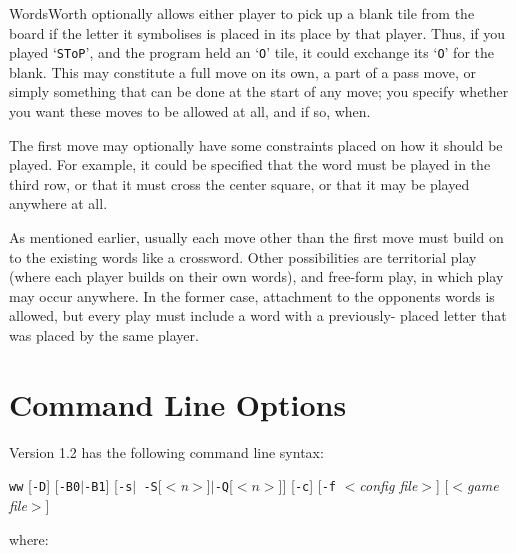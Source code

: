 WordsWorth optionally allows either player to pick up a blank 
tile from the board if the letter it symbolises is placed in its
place by that player. Thus, if you played `{\tt SToP}', and the program
held an `{\tt O}' tile, it could exchange its `{\tt O}' for the blank. This
may constitute a full move on its own, a part of a pass move, or
simply something that can be done at the start of any move; you
specify whether you want these moves to be allowed at all, and 
if so, when.

The first move may optionally have some constraints placed on how
it should be played. For example, it could be specified that the
word must be played in the third row, or that it must cross the
center square, or that it may be played anywhere at all.

As mentioned earlier, usually each move other than the first move
must build on to the existing words like a crossword. Other
possibilities are territorial play (where each player builds on
their own words), and free-form play, in which play may occur
anywhere. In the former case, attachment to the opponents words
is allowed, but every play must include a word with a previously-
placed letter that was placed by the same player.

\section{Command Line Options}

Version 1.2 has the following command line syntax:

{\tt ww} [{\tt -D}] [{\tt -B0}$\mid${\tt -B1}] [{\tt -s}$\mid${\tt
-S}[$<${\em n}$>$]$\mid${\tt -Q}[$<n>$]] [{\tt -c}] [{\tt -f} $<${\em config
file}$>$] [$<${\em game file}$>$]

where:

